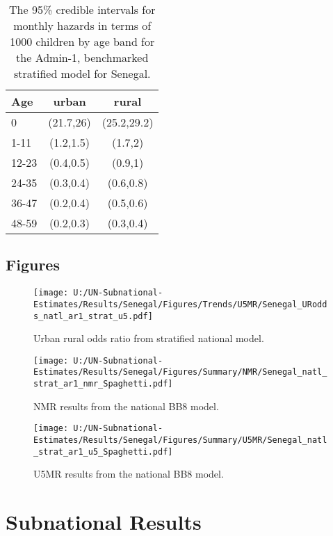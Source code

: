 \documentclass[
]{article}
\begin{document}
\begin{table}[ht]
\centering
\begin{tabular}{l|cc}
  \hline
Age & urban & rural \\ 
  \hline
0 & (21.7,26) & (25.2,29.2) \\ 
  1-11 & (1.2,1.5) & (1.7,2) \\ 
  12-23 & (0.4,0.5) & (0.9,1) \\ 
  24-35 & (0.3,0.4) & (0.6,0.8) \\ 
  36-47 & (0.2,0.4) & (0.5,0.6) \\ 
  48-59 & (0.2,0.3) & (0.3,0.4) \\ 
   \hline
\end{tabular}
\caption{The 95\% credible intervals for monthly hazards in terms of 1000 children by age band for the Admin-1, benchmarked stratified model for Senegal.} 
\end{table}

\clearpage

\hypertarget{figures}{%
\subsection{Figures}\label{figures}}

\begin{figure}
 \centering
\texttt{[image: U:/UN-Subnational-Estimates/Results/Senegal/Figures/Trends/U5MR/Senegal\_URodds\_natl\_ar1\_strat\_u5.pdf]}
\caption{Urban rural odds ratio from stratified national model.}
\end{figure}
\clearpage

\begin{figure}
 \centering
\texttt{[image: U:/UN-Subnational-Estimates/Results/Senegal/Figures/Summary/NMR/Senegal\_natl\_strat\_ar1\_nmr\_Spaghetti.pdf]}
\caption{NMR results from the national BB8 model.}
\end{figure}
\begin{figure}
 \centering
\texttt{[image: U:/UN-Subnational-Estimates/Results/Senegal/Figures/Summary/U5MR/Senegal\_natl\_strat\_ar1\_u5\_Spaghetti.pdf]}
\caption{U5MR results from the national BB8 model.}
\end{figure}
\clearpage

\clearpage

\hypertarget{subnational-results}{%
\section{Subnational Results}\label{subnational-results}}
\end{document}
